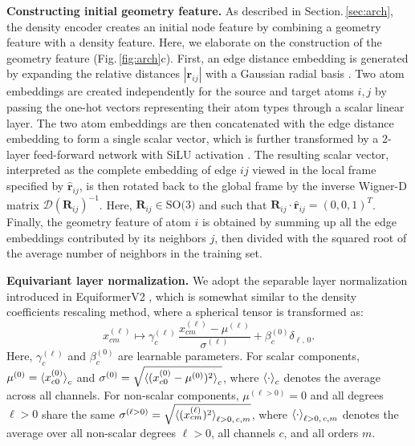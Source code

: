 \documentclass[%
reprint,
superscriptaddress,
bibnotes,
amsmath,amssymb,
aps,
floatfix, %
]{revtex4-2}
\begin{document}
\vspace{\baselineskip}
\noindent\textbf{Constructing initial geometry feature.} As described in Section.\,\ref{sec:arch}, the density encoder creates an initial node feature by combining a geometry feature with a density feature. Here, we elaborate on the construction of the geometry feature (Fig.\,\ref{fig:arch}c). First, an edge distance embedding is generated by expanding the relative distances $|\bm{r}_{ij}|$ with a Gaussian radial basis \cite{schnet2017}. Two atom embeddings are created independently for the source and target atoms $i,j$ by passing the one-hot vectors representing their atom types through a scalar linear layer. The two atom embeddings are then concatenated with the edge distance embedding to form a single scalar vector, which is further transformed by a 2-layer feed-forward network with SiLU activation \cite{silu2018}. The resulting scalar vector, interpreted as the complete embedding of edge $ij$ viewed in the local frame specified by $\hat{\bm{r}}_{ij}$, is then rotated back to the global frame by the inverse Wigner-D matrix $\mathcal{D}({\mathbf{R}_{ij}})^{-1}$. Here, $\mathbf{R}_{ij} \in \text{SO(3)}$ and such that $\mathbf{R}_{ij} \cdot \hat{\bm{r}}_{ij} = (0, 0, 1)^T$. Finally, the geometry feature of atom $i$ is obtained by summing up all the edge embeddings contributed by its neighbors $j$, then divided with the squared root of the average number of neighbors in the training set.

\vspace{\baselineskip}

\noindent\textbf{Equivariant layer normalization.} We adopt the separable layer normalization introduced in EquiformerV2 \cite{liao2023equiformerv2}, which is somewhat similar to the density coefficients rescaling method, where a spherical tensor is transformed as:
\begin{equation}
  x^{(\ell)}_{cm} \mapsto \gamma^{(\ell)}_c \,\frac{x^{(\ell)}_{cm} - \mu^{(\ell)}}{\sigma^{(\ell)}} + \beta^{(0)}_c \delta_{\ell,\,0}.
\end{equation}
Here, $\gamma^{(\ell)}_c$ and $\beta^{(0)}_c$ are learnable parameters. For scalar components, $\mu^{(0)} = \braket{x^{(0)}_{c0}}_{c}$ and $\sigma^{(0)} = \sqrt{\braket{(x^{(0)}_{c0} - \mu^{(0)})^2}_{c}}$, where $\braket{\cdot}_{c}$ denotes the average across all channels. For non-scalar components, $\mu^{(\ell > 0)} = 0$ and all degrees $\ell > 0$ share the same $\sigma^{(\ell > 0)} = \sqrt{\braket{(x^{(\ell)}_{cm})^2}_{\ell >0,\,c, m}}$, where $\braket{\cdot}_{\ell >0,\,c,m}$ denotes the average over all non-scalar degrees $\ell > 0$, all channels $c$, and all orders $m$.
\end{document}
